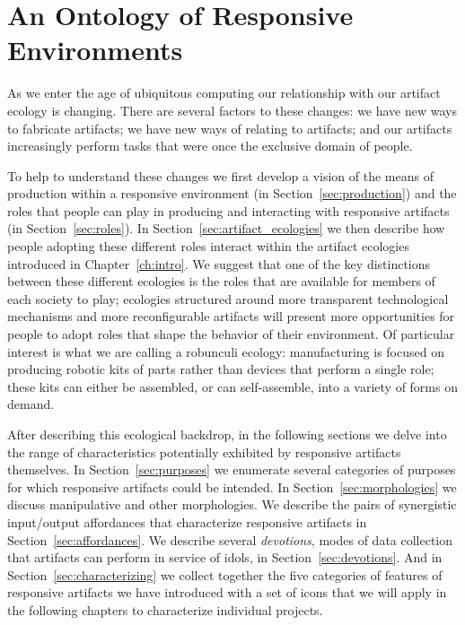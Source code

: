 \chapter{An Ontology of Responsive Environments}
\label{ch:ontology}
%
As we enter the age of ubiquitous computing our relationship with our artifact ecology is changing. 
There are several factors to these changes: we have new ways to fabricate artifacts; we have new ways of relating to artifacts; and our artifacts increasingly perform tasks that were once the exclusive domain of people.

To help to understand these changes we first develop a vision of the means of production within a responsive environment (in Section~\ref{sec:production}) and the roles that people can play in producing and interacting with responsive artifacts (in Section~\ref{sec:roles}). In Section~\ref{sec:artifact_ecologies} we then describe how people adopting these different roles interact within the artifact ecologies introduced in Chapter~\ref{ch:intro}. 
We suggest that one of the key distinctions between these different ecologies is the roles that are available for members of each society to play; ecologies structured around more transparent technological mechanisms and more reconfigurable artifacts will present more opportunities for people to adopt roles that shape the behavior of their environment. 
Of particular interest is what we are calling a robunculi ecology: manufacturing is focused on producing robotic kits of parts rather than devices that perform a single role; these kits can either be assembled, or can self-assemble, into a variety of forms on demand.

After describing this ecological backdrop, in the following sections we delve into the range of characteristics potentially exhibited by responsive artifacts themselves. In Section~\ref{sec:purposes} we enumerate several categories of purposes for which responsive artifacts could be intended. In Section~\ref{sec:morphologies} we discuss manipulative and other morphologies. We describe the pairs of synergistic input/output affordances that characterize responsive artifacts in Section~\ref{sec:affordances}. We describe several \emph{devotions}, modes of data collection that artifacts can perform in service of idols, in Section~\ref{sec:devotions}. And in Section~\ref{sec:characterizing} we collect together the five categories of features of responsive artifacts we have introduced with a set of icons that we will apply in the following chapters to characterize individual projects.

